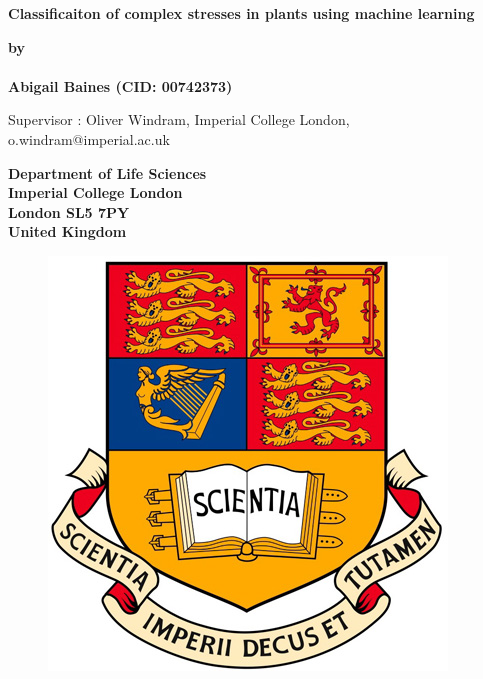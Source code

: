\thispagestyle{empty}
\null\vskip0.2in%
\begin{center}
\LARGE{{\bf 
Classificaiton of complex stresses in plants using machine learning}}
\end{center}

\vspace{0.5cm}

\begin{center}
{\Large {\bf by}}\\
\mbox{} \\
{\Large {\bf Abigail Baines (CID: 00742373)}}

{\Large Supervisor : Oliver Windram, Imperial College London, o.windram@imperial.ac.uk}
\end{center}

\vspace{1cm}

\begin{center}
\large{\bf{Department of Life Sciences \\ Imperial College London \\
London SL5 7PY \\ United Kingdom}}
\end{center}


\vspace{1cm}

\begin{figure}[!h]
\centering
\includegraphics[scale=0.35]{imperial_crest_colour.jpg}
\end{figure}

